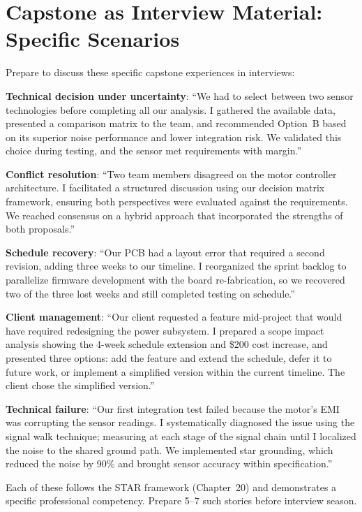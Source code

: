 \section{Capstone as Interview Material: Specific Scenarios}
Prepare to discuss these specific capstone experiences in interviews:

\textbf{Technical decision under uncertainty}: ``We had to select between two sensor technologies before completing all our analysis. I gathered the available data, presented a comparison matrix to the team, and recommended Option~B based on its superior noise performance and lower integration risk. We validated this choice during testing, and the sensor met requirements with margin.''

\textbf{Conflict resolution}: ``Two team members disagreed on the motor controller architecture. I facilitated a structured discussion using our decision matrix framework, ensuring both perspectives were evaluated against the requirements. We reached consensus on a hybrid approach that incorporated the strengths of both proposals.''

\textbf{Schedule recovery}: ``Our PCB had a layout error that required a second revision, adding three weeks to our timeline. I reorganized the sprint backlog to parallelize firmware development with the board re-fabrication, so we recovered two of the three lost weeks and still completed testing on schedule.''

\textbf{Client management}: ``Our client requested a feature mid-project that would have required redesigning the power subsystem. I prepared a scope impact analysis showing the 4-week schedule extension and \$200 cost increase, and presented three options: add the feature and extend the schedule, defer it to future work, or implement a simplified version within the current timeline. The client chose the simplified version.''

\textbf{Technical failure}: ``Our first integration test failed because the motor's EMI was corrupting the sensor readings. I systematically diagnosed the issue using the signal walk technique; measuring at each stage of the signal chain until I localized the noise to the shared ground path. We implemented star grounding, which reduced the noise by 90\% and brought sensor accuracy within specification.''

Each of these follows the STAR framework (Chapter~20) and demonstrates a specific professional competency. Prepare 5--7 such stories before interview season.

